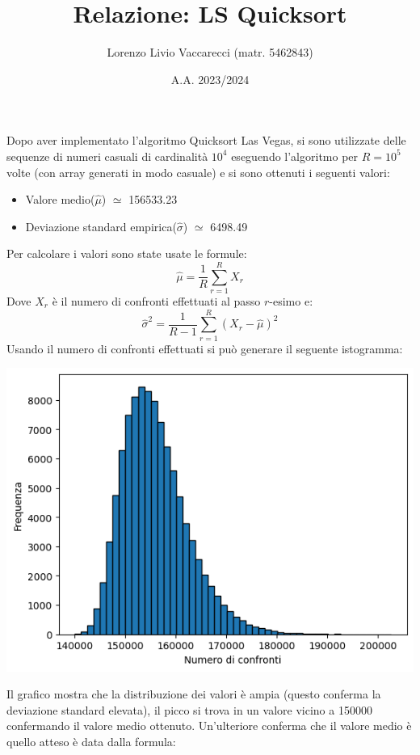 \documentclass[12pt]{article}
\title{Relazione: LS Quicksort}
\author{Lorenzo Livio Vaccarecci (matr. 5462843)}
\date{A.A. 2023/2024}
\begin{document}
\maketitle
Dopo aver implementato l'algoritmo Quicksort Las Vegas, 
si sono utilizzate delle sequenze di numeri casuali di 
cardinalità $10^{4}$ eseguendo l'algoritmo per $R=10^{5}$ 
volte (con array generati in modo casuale) e si sono ottenuti i seguenti valori:
\begin{itemize}
    \item Valore medio($\hat{\mu}$) $\simeq $ 156533.23
    \item Deviazione standard empirica($\hat{\sigma}$) $\simeq$ 6498.49
\end{itemize}
Per calcolare i valori sono state usate le formule:
\begin{equation*}
    \hat{\mu} = \frac{1}{R}\sum_{r=1}^{R}X_{r} 
\end{equation*}
Dove $X_{r}$ è il numero di confronti effettuati al passo $r$-esimo e:
\begin{equation*}
    \hat{\sigma}^{2} = \frac{1}{R-1}\sum_{r=1}^{R}(X_{r}-\hat{\mu})^{2}
\end{equation*}
Usando il numero di confronti effettuati si può generare il seguente 
istogramma:
\begin{center}
    \includegraphics[scale=0.8]{Istogramma.png}
\end{center}
Il grafico mostra che la distribuzione dei valori è ampia (questo 
conferma la deviazione standard elevata), il picco si trova in un 
valore vicino a 150000 confermando il valore medio ottenuto.
Un'ulteriore conferma che il valore medio è quello atteso è data dalla formula:
\end{document}
